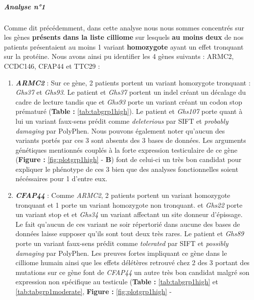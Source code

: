 \documentclass[12pt,twoside]{reedthesis}
\theoremstyle{definition}
\theoremstyle{definition}
\theoremstyle{remark}
\begin{document}
  \newpage
  
  \subparagraph{Analyse n°1}\label{analyse-n1}
  
  Comme dit précédemment, dans cette analyse nous nous sommes concentrés
  sur les gènes \textbf{présents dans la liste cilliome} sur lesquels
  \textbf{au moins deux} de nos patients présentaient au moins 1 variant
  \textbf{homozygote} ayant un effet tronquant sur la protéine. Nous avons
  ainsi pu identifier les 4 gènes suivants : ARMC2, CCDC146, CFAP44 et
  TTC29 :
  
  \begin{enumerate}
  \def\labelenumi{\arabic{enumi}.}
  \item
    \textbf{\emph{ARMC2}} : Sur ce gène, 2 patients portent un variant
    homozygote tronquant : \emph{Ghs37} et \emph{Ghs93}. Le patient et
    \emph{Ghs37} portent un indel créant un décalage du cadre de lecture
    tandis que et \emph{Ghs93} porte un variant créant un codon stop
    prématuré (\textbf{Table : }\ref{tab:tabgrp1high}). Le patient et
    \emph{Ghs107} porte quant à lui un variant faux-sens prédit comme
    \emph{deleterious} par SIFT et \emph{probably damaging} par PolyPhen.
    Nous pouvons également noter qu'aucun des variants portés par ces 3
    sont absents des 3 bases de données. Les arguments génétiques
    mentionnés couplés à la forte expression testiculaire de ce gène
    (\textbf{Figure : }\ref{fig:plotgrp1high} - \textbf{B}) font de
    celui-ci un très bon candidat pour expliquer le phénotype de ces 3
    bien que des analyses fonctionnelles soient nécéssaires pour 1 d'entre
    eux.
  \item
    \textbf{\emph{CFAP44}} : Comme \emph{ARMC2}, 2 patients portent un
    variant homozygote tronquant et 1 porte un variant homozygote non
    tronquant. et \emph{Ghs22} porte un variant stop et et \emph{Ghs34} un
    variant affectant un site donneur d'épissage. Le fait qu'aucun de ces
    variant ne soir répertorié dans aucune des bases de données laisse
    supposer qu'ils sont tout deux très rares. Le patient et \emph{Ghs89}
    porte un variant faux-sens prédit comme \emph{tolerated} par SIFT et
    \emph{possibly damaging} par PolyPhen. Les preuves fortes impliquant
    ce gène dans le cilliome humain ainsi que les effets délétères
    retrouvé chez 2 des 3 portant des mutations sur ce gène font de
    \emph{CFAP44} un autre très bon candidat malgré son expression non
    spécifique au testicule (\textbf{Table : }\ref{tab:tabgrp1high} et
    \ref{tab:tabgrp1moderate}, \textbf{Figure : }\ref{fig:plotgrp1high} -

\end{enumerate}
\end{document}
